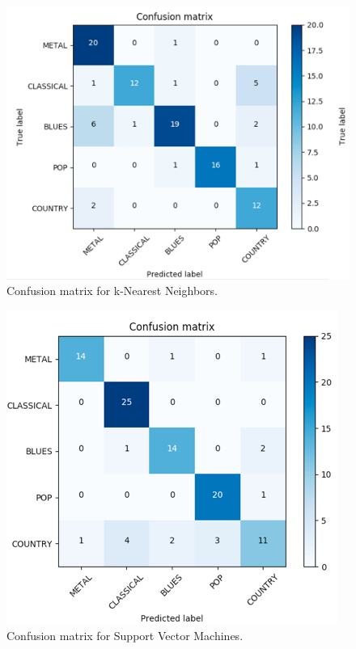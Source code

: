 \begin{figure}
\begin{center}
\includegraphics[scale=0.3]{./figures/confusion_knn.png}
\end{center}
\caption
{
Confusion matrix for k-Nearest Neighbors.
}
\label{fig:big_picture5}
\end{figure}

\begin{figure}
\begin{center}
\includegraphics[scale=0.3]{./figures/confusion_svm.png}
\end{center}
\caption
{
Confusion matrix for Support Vector Machines.
}
\label{fig:big_picture5}
\end{figure}


